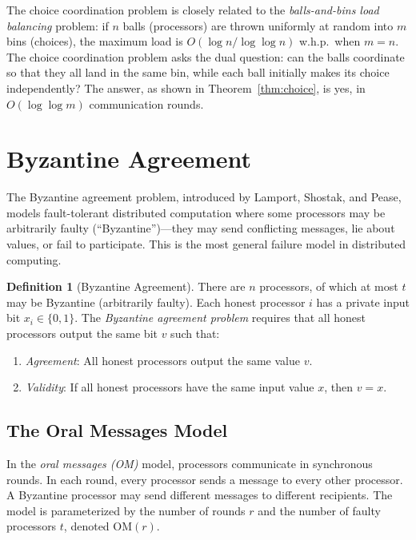 \documentclass[twoside,12pt]{book}
\theoremstyle{plain}
\theoremstyle{definition}
\newtheorem{definition}[theorem]{Definition}
\theoremstyle{remark}
\begin{document}
The choice coordination problem is closely related to the \emph{balls-and-bins load balancing} problem: if $n$ balls (processors) are thrown uniformly at random into $m$ bins (choices), the maximum load is $O(\log n / \log \log n)$ w.h.p.\ when $m = n$. The choice coordination problem asks the dual question: can the balls coordinate so that they all land in the same bin, while each ball initially makes its choice independently? The answer, as shown in Theorem~\ref{thm:choice}, is yes, in $O(\log \log m)$ communication rounds.

\section{Byzantine Agreement}
\label{sec:byzantine}

The Byzantine agreement problem, introduced by Lamport, Shostak, and Pease, models fault-tolerant distributed computation where some processors may be arbitrarily faulty (``Byzantine'')---they may send conflicting messages, lie about values, or fail to participate. This is the most general failure model in distributed computing.

\begin{definition}[Byzantine Agreement]
\label{def:byzantine}
There are $n$ processors, of which at most $t$ may be Byzantine (arbitrarily faulty). Each honest processor $i$ has a private input bit $x_i \in \{0, 1\}$. The \emph{Byzantine agreement problem} requires that all honest processors output the same bit $v$ such that:
\begin{enumerate}[label=(\roman*)]
\item \emph{Agreement}: All honest processors output the same value $v$.
\item \emph{Validity}: If all honest processors have the same input value $x$, then $v = x$.
\end{enumerate}
\end{definition}

\subsection{The Oral Messages Model}
\label{subsec:oral-messages}

In the \emph{oral messages (OM)} model, processors communicate in synchronous rounds. In each round, every processor sends a message to every other processor. A Byzantine processor may send different messages to different recipients. The model is parameterized by the number of rounds $r$ and the number of faulty processors $t$, denoted $\mathrm{OM}(r)$.
\end{document}
